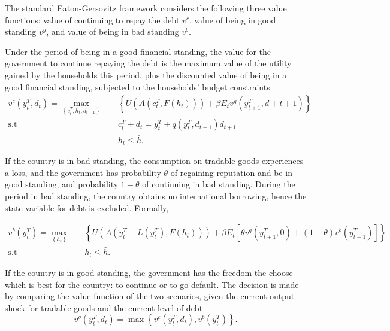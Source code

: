 The standard Eaton-Gersovitz framework considers the following three value functions:
value of continuing to repay the debt $v^c$, value of being in good standing $v^g$, and value of being in bad standing $v^b$.

Under the period of being in a good financial standing, the value for the government to continue repaying the debt is the maximum value of the utility gained by the households this period, plus the discounted value of being in a good financial standing, subjected to the households' budget constraints
\begin{equation}
    \begin{aligned}
        v^c(y^T_t, d_t) = \max_{\left\{ c^T_t, h_t, d_{t+1} \right\}} \quad
        &\left\{
            U\left(
                A\left(c^T_t, F(h_t)\right)
             \right)
             + \beta E_t
             v^g \left(
                y^T_{t+1}, d+{t+1}
              \right)
         \right\}\\
          \text{s.t} \quad& c^T_t + d_t = y^T_t + q(y^T_t, d_{t+1}) d_{t+1} \\
                    & h_t \le \bar{h}.
    \end{aligned}
\end{equation}

If the country is in bad standing, the consumption on tradable goods experiences a loss, and the government has probability $\theta$ of regaining reputation and be in good standing, and probability $1 - \theta$ of continuing in bad standing. During the period in bad standing, the country obtains no international borrowing, hence the state variable for debt is excluded. Formally,

\begin{equation}
    \begin{aligned}
        v^b(y^T_t) = \max_{\left\{ h_t \right\}} \quad
        &\left\{
            U\left(
                A\left( y^T_t - L(y^T_t), F(h_t)\right)
             \right)
             + \beta E_t \left[
                \theta v^g \left(
                    y^T_{t+1}, 0
                \right)
                + (1-\theta) v^b \left(
                    y^{T}_{t+1}
                 \right)
            \right]
         \right\}\\
          \text{s.t} \quad& h_t \le \bar{h}.
    \end{aligned}
\end{equation}

If the country is in good standing, the government has the freedom the choose which is best for the country: to continue or to go default. The decision is made by comparing the value function of the two scenarios, given the current output shock for tradable goods and the current level of debt
\begin{equation}
    v^g(y^T_t, d_t) = \max\left\{
        v^c(y^T_t, d_t) ,
        v^b(y^T_t)
     \right\}.
\end{equation}

